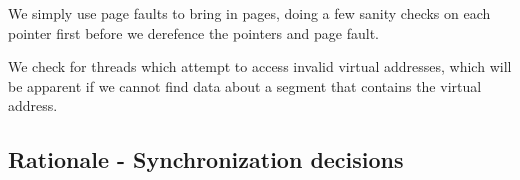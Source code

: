 
We simply use page faults to bring in pages, doing a few sanity checks on each
pointer first before we derefence the pointers and page fault.

We check for threads which attempt to access invalid virtual addresses, which
will be apparent if we cannot find data about a segment that contains the
virtual address.

\subsection{Rationale - Synchronization decisions}

